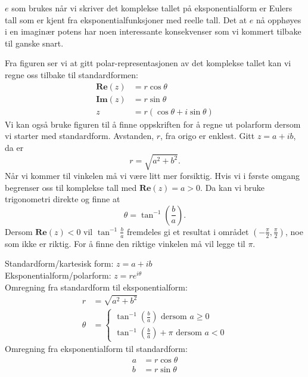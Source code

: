 \documentclass[a4paper,norsk,12pt]{article}
\begin{document}
$e$ som brukes når vi skriver det komplekse tallet på eksponentialform er Eulers tall som er kjent fra eksponentialfunksjoner med reelle tall. Det at $e$ nå opphøyes i en imaginær potens har noen interessante konsekvenser som vi kommert tilbake til ganske snart.

Fra figuren ser vi at gitt polar-representasjonen av det komplekse tallet kan vi regne oss tilbake til standardformen:
\begin{align*}
	\mathbf{Re}(z) &= r\cos\theta \\
	\mathbf{Im}(z) &= r\sin\theta \\
	z &= r(\cos\theta + i\sin\theta) 
\end{align*}
Vi kan også bruke figuren til å finne oppskriften for å regne ut polarform dersom vi starter med standardform. Avstanden, $r$, fra origo er enklest. Gitt $z=a + ib$, da er
\begin{displaymath}
	r = \sqrt{a^2 + b^2}.
\end{displaymath}
Når vi kommer til vinkelen må vi være litt mer forsiktig. Hvis vi i første omgang begrenser oss til komplekse tall med $\mathbf{Re}(z)=a>0$. Da kan vi bruke trigonometri direkte og finne at
\begin{displaymath}
	\theta = \tan^{-1}\left(\frac{b}{a}\right).
\end{displaymath}
Dersom $\mathbf{Re}(z)<0$ vil $\tan^{-1}\frac{b}{a}$ fremdeles gi et resultat i området $\left(-\frac{\pi}{2},\frac{\pi}{2}\right)$, noe som ikke er riktig. For å finne den riktige vinkelen må vil legge til $\pi$.

\begin{tsummary}
Standardform/kartesisk form: $z = a + ib$ \\
Eksponentialform/polarform: $z = re^{i\theta}$ \\[12pt]

Omregning fra standardform til eksponentialform:
\begin{align*}
	r &= \sqrt{a^2+b^2} \\
	\theta &= \begin{cases} 
		\tan^{-1}\left(\frac{b}{a}\right) \text{ dersom } a\geq0 \\
		\tan^{-1}\left(\frac{b}{a}\right)+\pi \text{ dersom } a <0
	\end{cases}
\end{align*}
Omregning fra eksponentialform til standardform:
\begin{align*}
	a &= r\cos\theta \\
	b &= r\sin\theta
\end{align*}
\end{tsummary}
\end{document}
